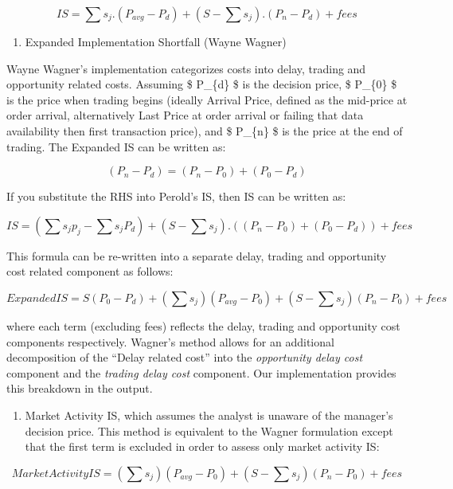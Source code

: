 \[ {IS = \sum s_{j} . (P_{avg} - P_{d}) + (S - \sum s_{j}) . (P_{n} - P_{d}) + fees} \]

\begin{enumerate}
\def\labelenumi{\arabic{enumi}.}
\setcounter{enumi}{2}
\tightlist
\item
  Expanded Implementation Shortfall (Wayne Wagner)
\end{enumerate}

Wayne Wagner's implementation categorizes costs into delay, trading and
opportunity related costs. Assuming \$ P\_\{d\} \$ is the decision
price, \$ P\_\{0\} \$ is the price when trading begins (ideally Arrival
Price, defined as the mid-price at order arrival, alternatively Last
Price at order arrival or failing that data availability then first
transaction price), and \$ P\_\{n\} \$ is the price at the end of
trading. The Expanded IS can be written as:

\[ (P_{n} - P_{d}) = (P_{n} - P_{0}) + (P_{0} - P_{d}) \]

If you substitute the RHS into Perold's IS, then IS can be written as:

\[ IS = (\sum s_{j}p_{j} - \sum s_{j}P_{d}) + (S - \sum s_{j}) . ((P_{n} - P_{0}) + (P_{0} - P_{d})) + fees \]

This formula can be re-written into a separate delay, trading and
opportunity cost related component as follows:

\[ Expanded IS = S(P_{0} - P_{d}) + (\sum s_{j})(P_{avg} - P_{0}) + (S - \sum s_{j})(P_{n} - P_{0}) + fees \]

where each term (excluding fees) reflects the delay, trading and
opportunity cost components respectively. Wagner's method allows for an
additional decomposition of the ``Delay related cost'' into the
\emph{opportunity delay cost} component and the
\emph{trading delay cost} component. Our implementation provides this
breakdown in the output.

\begin{enumerate}
\def\labelenumi{\arabic{enumi}.}
\setcounter{enumi}{3}
\tightlist
\item
  Market Activity IS, which assumes the analyst is unaware of the
  manager's decision price. This method is equivalent to the Wagner
  formulation except that the first term is excluded in order to assess
  only market activity IS:
\end{enumerate}

\[ Market Activity IS = (\sum s_{j})(P_{avg} - P_{0}) + (S - \sum s_{j})(P_{n} - P_{0}) + fees \]

